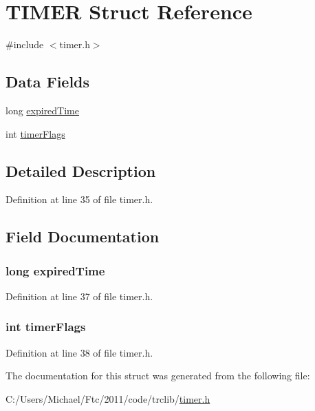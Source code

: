 \hypertarget{struct_t_i_m_e_r}{
\section{TIMER Struct Reference}
\label{struct_t_i_m_e_r}
}


{\ttfamily \#include $<$timer.h$>$}

\subsection*{Data Fields}
\begin{DoxyCompactItemize}
\item 
long \hyperlink{struct_t_i_m_e_r_af69c914fca4f237daddd45adf82f0fd9}{expiredTime}
\item 
int \hyperlink{struct_t_i_m_e_r_a93f05de6494f7b766e519f86f70b471b}{timerFlags}
\end{DoxyCompactItemize}


\subsection{Detailed Description}


Definition at line 35 of file timer.h.



\subsection{Field Documentation}
\hypertarget{struct_t_i_m_e_r_af69c914fca4f237daddd45adf82f0fd9}{
\subsubsection[{expiredTime}]{\setlength{\rightskip}{0pt plus 5cm}long {\bf expiredTime}}}
\label{struct_t_i_m_e_r_af69c914fca4f237daddd45adf82f0fd9}


Definition at line 37 of file timer.h.

\hypertarget{struct_t_i_m_e_r_a93f05de6494f7b766e519f86f70b471b}{
\subsubsection[{timerFlags}]{\setlength{\rightskip}{0pt plus 5cm}int {\bf timerFlags}}}
\label{struct_t_i_m_e_r_a93f05de6494f7b766e519f86f70b471b}


Definition at line 38 of file timer.h.



The documentation for this struct was generated from the following file:\begin{DoxyCompactItemize}
\item 
C:/Users/Michael/Ftc/2011/code/trclib/\hyperlink{timer_8h}{timer.h}\end{DoxyCompactItemize}

